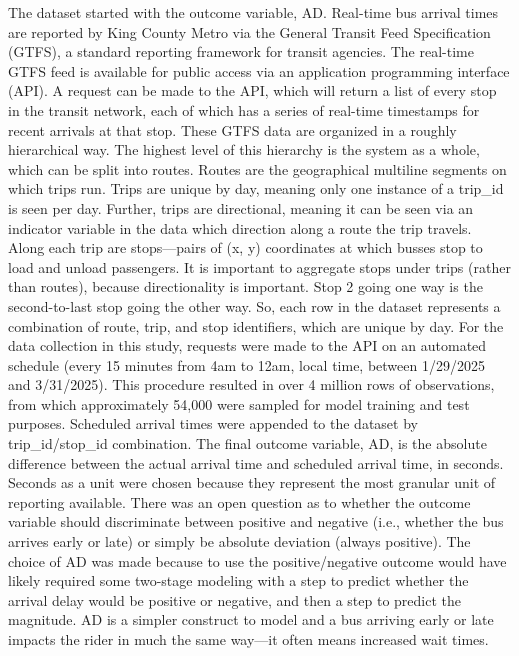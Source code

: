 \documentclass[
  12pt,
]{article}
\begin{document}
The dataset started with the outcome variable, AD. Real-time bus arrival
times are reported by King County Metro via the General Transit Feed
Specification (GTFS), a standard reporting framework for transit
agencies. The real-time GTFS feed is available for public access via an
application programming interface (API). A request can be made to the
API, which will return a list of every stop in the transit network, each
of which has a series of real-time timestamps for recent arrivals at
that stop. These GTFS data are organized in a roughly hierarchical way.
The highest level of this hierarchy is the system as a whole, which can
be split into routes. Routes are the geographical multiline segments on
which trips run. Trips are unique by day, meaning only one instance of a
trip\_id is seen per day. Further, trips are directional, meaning it can
be seen via an indicator variable in the data which direction along a
route the trip travels. Along each trip are stops---pairs of (x, y)
coordinates at which busses stop to load and unload passengers. It is
important to aggregate stops under trips (rather than routes), because
directionality is important. Stop 2 going one way is the second-to-last
stop going the other way. So, each row in the dataset represents a
combination of route, trip, and stop identifiers, which are unique by
day. For the data collection in this study, requests were made to the
API on an automated schedule (every 15 minutes from 4am to 12am, local
time, between 1/29/2025 and 3/31/2025). This procedure resulted in over
4 million rows of observations, from which approximately 54,000 were
sampled for model training and test purposes. Scheduled arrival times
were appended to the dataset by trip\_id/stop\_id combination. The final
outcome variable, AD, is the absolute difference between the actual
arrival time and scheduled arrival time, in seconds. Seconds as a unit
were chosen because they represent the most granular unit of reporting
available. There was an open question as to whether the outcome variable
should discriminate between positive and negative (i.e., whether the bus
arrives early or late) or simply be absolute deviation (always
positive). The choice of AD was made because to use the
positive/negative outcome would have likely required some two-stage
modeling with a step to predict whether the arrival delay would be
positive or negative, and then a step to predict the magnitude. AD is a
simpler construct to model and a bus arriving early or late impacts the
rider in much the same way---it often means increased wait times.
\end{document}
